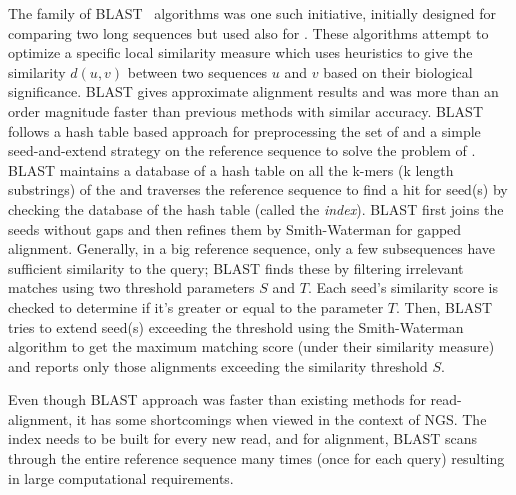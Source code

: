 The family of BLAST~\citep{altschul1990basic, altschul1997gapped} algorithms was one such initiative, initially designed for comparing two long sequences but used also for \ra. These algorithms attempt to optimize a specific local similarity measure which uses heuristics to give the similarity $d(u, v)$ between two sequences $u$ and $v$ based on their biological significance. BLAST gives approximate alignment results and was more than an order magnitude faster than previous methods with similar accuracy. BLAST follows a hash table based approach for preprocessing the set of \reads and a simple seed-and-extend strategy on the reference sequence to solve the problem of \ra. BLAST maintains a database of a hash table on all the k-mers (k length substrings) of the \reads and traverses the reference sequence to find a hit for seed(s) by checking the database of the hash table (called the \textit{index}). BLAST first joins the seeds without gaps and then refines them by Smith-Waterman for gapped alignment. Generally, in a big reference sequence, only a few subsequences have sufficient similarity to the query; BLAST finds these by filtering irrelevant matches using two threshold parameters $S$ and $T$. Each seed's similarity score is checked to determine if it's greater or equal to the parameter $T$. Then, BLAST tries to extend seed(s) exceeding the threshold using the Smith-Waterman algorithm to get the maximum matching score (under their similarity measure) and reports only those alignments exceeding the similarity threshold $S$.

Even though BLAST approach was faster than existing methods for read-alignment, it has some shortcomings when viewed in the context of NGS. The index needs to be built for every new read, and for alignment, BLAST scans through the entire reference sequence many times (once for each query) resulting in large computational requirements. 


